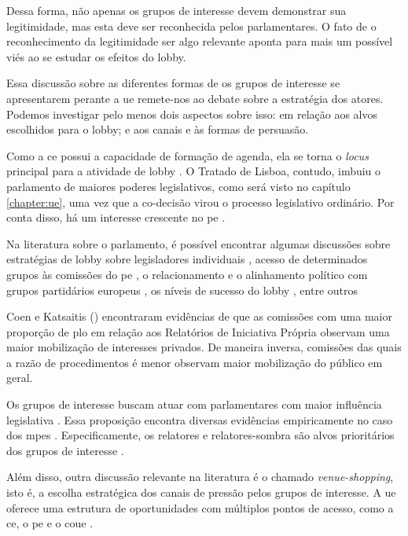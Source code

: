    Dessa forma, não apenas os grupos de interesse devem demonstrar sua legitimidade, mas esta deve ser reconhecida pelos parlamentares. O fato de o reconhecimento da legitimidade ser algo relevante aponta para mais um possível viés ao se estudar os efeitos do lobby.

    Essa discussão sobre as diferentes formas de os grupos de interesse se apresentarem perante a \acrshort{ue} remete-nos ao debate sobre a estratégia dos atores. Podemos investigar pelo menos dois aspectos sobre isso: em relação aos alvos escolhidos para o lobby; e aos canais e às formas de persuasão.

    Como a \acrshort{ce} possui a capacidade de formação de agenda, ela se torna o \textit{locus} principal para a atividade de lobby \cite{cram2001whither, pollack_delegation_2002}. O Tratado de Lisboa, contudo, imbuiu o parlamento de maiores poderes legislativos, como será visto no capítulo \ref{chapter:ue}, uma vez que a co-decisão virou o processo legislativo ordinário. Por conta disso, há um interesse crescente no \acrshort{pe} \cite{hix2013empowerment, Dionigi2017}.
    
    Na literatura sobre o parlamento, é possível encontrar algumas discussões sobre estratégias de lobby sobre legisladores individuais \cite{marshall2015explaining}, acesso de determinados grupos às comissões do \acrshort{pe} \cite{marshall2010lobby}, o relacionamento e o alinhamento político com grupos partidários europeus \cite{beyers2015alignment}, os níveis de sucesso do lobby \cite{Dionigi2017}, entre outros

    Coen e Katsaitis (\citeyear{coen2019legislative}) encontraram evidências de que as comissões com uma maior proporção de \acrfull{plo} em relação aos Relatórios de Iniciativa Própria observam uma maior mobilização de interesses privados. De maneira inversa, comissões das quais a razão de procedimentos é menor observam maior mobilização do público em geral.

    Os grupos de interesse buscam atuar com parlamentares com maior influência legislativa \cite{marshall2010lobby}. Essa proposição encontra diversas evidências empiricamente no caso dos \acrshort{mpe}s \cite{kluver2015legislative, marshall2010lobby}. Especificamente, os relatores e relatores-sombra são alvos prioritários dos grupos de interesse \cite{kluver2015legislative}.

Além disso, outra discussão relevante na literatura é o chamado \textit{venue-shopping}, isto é, a escolha estratégica dos canais de pressão pelos grupos de interesse. A \acrshort{ue} oferece uma estrutura de oportunidades com múltiplos pontos de acesso, como a \acrshort{ce}, o \acrshort{pe} e o \acrfull{coue} \cite{richardson2000government}.


